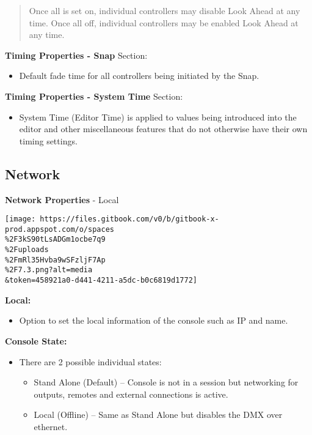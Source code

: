 \documentclass[
]{article}
\providecommand{\tightlist}{%
  \setlength{\itemsep}{0pt}\setlength{\parskip}{0pt}}
\begin{document}
\begin{quote}
Once all is set on, individual controllers may disable Look Ahead at any time. Once all off, individual controllers may be enabled Look Ahead at any time.
\end{quote}

\textbf{Timing Properties - Snap} Section:

\begin{itemize}
\tightlist
\item
  Default fade time for all controllers being initiated by the Snap.
\end{itemize}

\textbf{Timing Properties - System Time} Section:

\begin{itemize}
\tightlist
\item
  System Time (Editor Time) is applied to values being introduced into the editor and other miscellaneous features that do not otherwise have their own timing settings.
\end{itemize}

\hypertarget{network}{%
\subsection{Network}\label{network}}

\textbf{Network Properties} - Local

\texttt{[image: https://files.gitbook.com/v0/b/gitbook-x-prod.appspot.com/o/spaces\\\%2F3kS90tLsADGm1ocbe7q9\\\%2Fuploads\\\%2FmRl35Hvba9wSFzljF7Ap\\\%2F7.3.png?alt=media\\\&token=458921a0-d441-4211-a5dc-b0c6819d1772]}

\textbf{Local:}

\begin{itemize}
\tightlist
\item
  Option to set the local information of the console such as IP and name.
\end{itemize}

\textbf{Console State:}

\begin{itemize}
\tightlist
\item
  There are 2 possible individual states:

  \begin{itemize}
  \tightlist
  \item
    Stand Alone (Default) -- Console is not in a session but networking for outputs, remotes and external connections is active.
  \item
    Local (Offline) -- Same as Stand Alone but disables the DMX over ethernet.
  \end{itemize}
\end{itemize}
\end{document}
